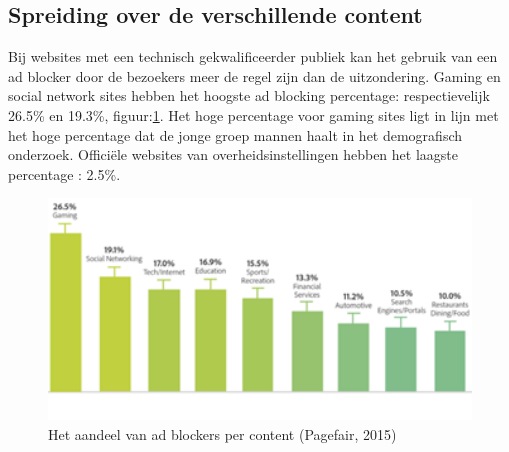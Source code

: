 \documentclass[pdftex,a4paper,12pt,twoside]{report}
\begin{document}
\newpage
\subsection{Spreiding over de verschillende content}
\label{sec Spreiding over de verschillende content}
Bij websites met een technisch gekwalificeerder publiek kan het gebruik van een ad blocker door de bezoekers meer de regel zijn dan de uitzondering. Gaming en social network sites hebben het hoogste ad blocking percentage: respectievelijk 26.5\% en 19.3\%, figuur:\ref{fig: percontent}. Het hoge percentage voor gaming sites ligt in lijn met het hoge percentage dat de jonge groep mannen haalt in het demografisch onderzoek. Officiële websites van overheidsinstellingen hebben het laagste percentage : 2.5\%.

\begin{figure}[h!]
\centering
\includegraphics[width=15cm]{img/percontent}
\caption{Het aandeel van ad blockers per content (Pagefair, 2015)}
\label{fig: percontent}
\end{figure}
\end{document}
